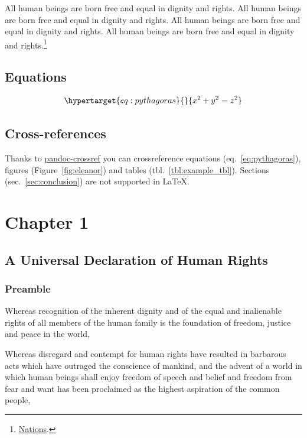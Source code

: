 \documentclass[
  titlepage,
  openright,
  DIV=calc,
  toc=listof,
  listof=nochaptergap]{scrbook}
\begin{document}
All human beings are born free and equal in dignity and rights. All
human beings are born free and equal in dignity and rights. All human
beings are born free and equal in dignity and rights. All human beings
are born free and equal in dignity and rights.\footnote{\protect\hyperlink{ref-unitednations1948}{Nations}.}

\hypertarget{equations}{%
\section{Equations}\label{equations}}

\begin{equation}\protect\hypertarget{eq:pythagoras}{}{x^2 + y^2 = z^2}\label{eq:pythagoras}\end{equation}

\hypertarget{cross-references}{%
\section{Cross-references}\label{cross-references}}

Thanks to
\href{https://lierdakil.github.io/pandoc-crossref/}{pandoc-crossref} you
can crossreference equations (eq.~\ref{eq:pythagoras}), figures
(Figure~\ref{fig:eleanor}) and tables (tbl.~\ref{tbl:example_tbl}).
Sections (sec.~\ref{sec:conclusion}) are not supported in LaTeX.

\hypertarget{sec:chapter1}{%
\chapter{Chapter 1}\label{sec:chapter1}}

\hypertarget{a-universal-declaration-of-human-rights}{%
\section{A Universal Declaration of Human
Rights}\label{a-universal-declaration-of-human-rights}}

\hypertarget{preamble}{%
\subsection{Preamble}\label{preamble}}

Whereas recognition of the inherent dignity and of the equal and
inalienable rights of all members of the human family is the foundation
of freedom, justice and peace in the world,

Whereas disregard and contempt for human rights have resulted in
barbarous acts which have outraged the conscience of mankind, and the
advent of a world in which human beings shall enjoy freedom of speech
and belief and freedom from fear and want has been proclaimed as the
highest aspiration of the common people,
\end{document}
